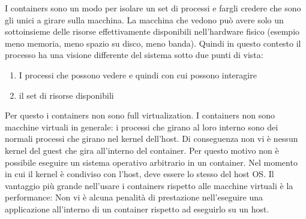 \documentclass{article}
\begin{document}
I containers sono un modo per isolare un set di processi e fargli credere che sono gli unici a girare sulla macchina. La macchina che vedono può avere solo un sottoinsieme delle risorse effettivamente disponibili nell'hardware fisico (esempio meno memoria, meno spazio su disco, meno banda). Quindi in questo contesto il processo ha una visione differente del sistema sotto due punti di vista:
\begin{enumerate}
    \item I processi che possono vedere e quindi con cui possono interagire
    \item il set di risorse disponibili
\end{enumerate}
Per questo i containers non sono full virtualization.
I containers non sono macchine virtuali in generale: i processi che girano al loro interno sono dei normali processi che girano nel kernel dell'host. Di conseguenza non vi è nessun kernel del guest che gira all'interno del container. Per questo motivo non è possibile eseguire un sistema operativo arbitrario in un container. Nel momento in cui il kernel è condiviso con l'host, deve essere lo stesso del host OS. Il vantaggio più grande nell'usare i containers rispetto alle macchine virtuali è la performance: Non vi è alcuna penalità di prestazione nell'eseguire una applicazione all'interno di un container rispetto ad eseguirlo su un host.\\
\end{document}
